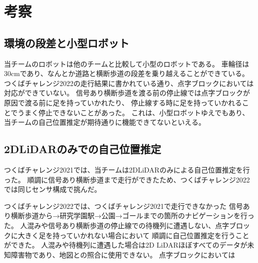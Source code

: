 \documentclass[twocolumn,9pt]{jsproceedings}
\begin{document}




\section{考察}

\subsection{環境の段差と小型ロボット}

当チームのロボットは他のチームと比較して小型のロボットである。
車輪径は30cmであり、なんとか道路と横断歩道の段差を乗り越えることができている。
つくばチャレンジ2022の走行結果に書かれている通り、点字ブロックにおいては対応ができていない。
信号あり横断歩道を渡る前の停止線では点字ブロックが原因で渡る前に足を持っていかれたり、
停止線する時に足を持っていかれることでうまく停止できないことがあった。
これは、小型ロボットゆえでもあり、当チームの自己位置推定が期待通りに機能できてないといえる。

\subsection{2DLiDARのみでの自己位置推定}

つくばチャレンジ2021では、当チームは2DLiDARのみによる自己位置推定を行った\cite{RTshop}。
順調に信号あり横断歩道まで走行ができたため、つくばチャレンジ2022では同じセンサ構成で挑んだ。

つくばチャレンジ2022では、つくばチャレンジ2021で走行できなかった
信号あり横断歩道から→研究学園駅→公園→ゴールまでの箇所のナビゲーションを行った。
人混みや信号あり横断歩道の停止線での待機列に遭遇しない、点字ブロックに大きく足を持っていかれない場合において
順調に自己位置推定を行うことができた。
人混みや待機列に遭遇した場合は2D LiDARほぼすべてのデータが未知障害物であり、地図との照合に使用できない。
点字ブロックにおいては
\end{document}
